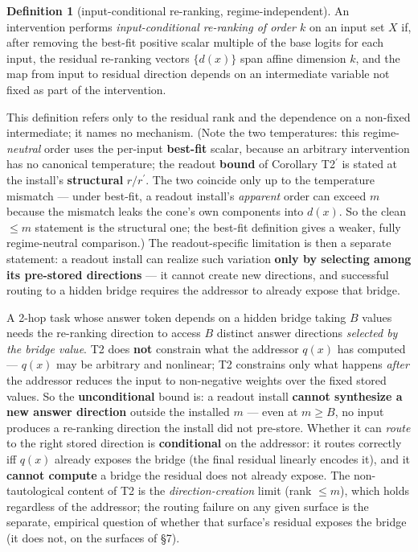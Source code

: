 \documentclass[11pt]{article}
\theoremstyle{plain}
\theoremstyle{definition}
\newtheorem*{mydef}{Definition}
\begin{document}
\begin{mydef}[input-conditional re-ranking, regime-independent]
An intervention performs \emph{input-conditional re-ranking of order $k$} on an input set $X$ if, after removing the best-fit positive scalar multiple of the base logits for each input, the residual re-ranking vectors $\{d(x)\}$ span affine dimension $k$, and the map from input to residual direction depends on an intermediate variable not fixed as part of the intervention.
\end{mydef}

This definition refers only to the residual rank and the dependence on a non-fixed intermediate; it names no mechanism. (Note the two temperatures: this regime-\emph{neutral} order uses the per-input \textbf{best-fit} scalar, because an arbitrary intervention has no canonical temperature; the readout \textbf{bound} of Corollary T2$^{\prime}$ is stated at the install's \textbf{structural} $r/r^{\prime}$. The two coincide only up to the temperature mismatch --- under best-fit, a readout install's \emph{apparent} order can exceed $m$ because the mismatch leaks the cone's own components into $d(x)$. So the clean $\le m$ statement is the structural one; the best-fit definition gives a weaker, fully regime-neutral comparison.) The readout-specific limitation is then a separate statement: a readout install can realize such variation \textbf{only by selecting among its pre-stored directions} --- it cannot create new directions, and successful routing to a hidden bridge requires the addressor to already expose that bridge.

A 2-hop task whose answer token depends on a hidden bridge taking $B$ values needs the re-ranking direction to access $B$ distinct answer directions \emph{selected by the bridge value}. T2 does \textbf{not} constrain what the addressor $q(x)$ has computed --- $q(x)$ may be arbitrary and nonlinear; T2 constrains only what happens \emph{after} the addressor reduces the input to non-negative weights over the fixed stored values. So the \textbf{unconditional} bound is: a readout install \textbf{cannot synthesize a new answer direction} outside the installed $m$ --- even at $m \ge B$, no input produces a re-ranking direction the install did not pre-store. Whether it can \emph{route} to the right stored direction is \textbf{conditional} on the addressor: it routes correctly iff $q(x)$ already exposes the bridge (the final residual linearly encodes it), and it \textbf{cannot compute} a bridge the residual does not already expose. The non-tautological content of T2 is the \emph{direction-creation} limit (rank $\le m$), which holds regardless of the addressor; the routing failure on any given surface is the separate, empirical question of whether that surface's residual exposes the bridge (it does not, on the surfaces of \S7).
\end{document}
